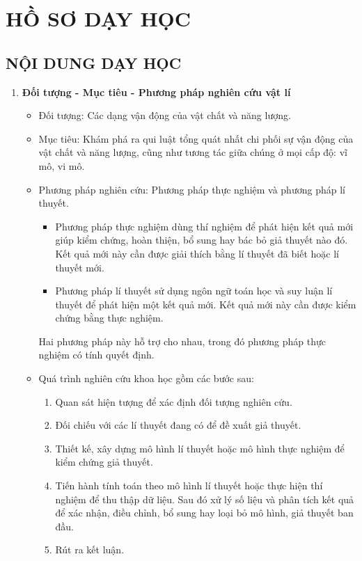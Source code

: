 \section{HỒ SƠ DẠY HỌC}
\subsection{NỘI DUNG DẠY HỌC}
\begin{enumerate}[label=\bfseries\arabic*.]
	\item \textbf{Đối tượng - Mục tiêu - Phương pháp nghiên cứu vật lí}
	\begin{itemize}
		\item Đối tượng: Các dạng vận động của vật chất và năng lượng.
		\item Mục tiêu: Khám phá ra qui luật tổng quát nhất chi phối sự vận động của vật chất và năng lượng, cũng như tương tác giữa chúng ở mọi cấp độ: vĩ mô, vi mô.
		\item Phương pháp nghiên cứu: Phương pháp thực nghiệm và phương pháp lí thuyết.
		\begin{itemize}
			\item Phương pháp thực nghiệm dùng thí nghiệm để phát hiện kết quả mới giúp kiểm chứng, hoàn thiện, bổ sung hay bác bỏ giả thuyết nào đó. Kết quả mới này cần được giải thích bằng lí thuyết đã biết hoặc lí thuyết mới.
			\item Phương pháp lí thuyết sử dụng ngôn ngữ toán học và suy luận lí thuyết để phát hiện một kết quả mới. Kết quả mới này cần được kiểm chứng bằng thực nghiệm.
		\end{itemize}
	Hai phương pháp này hỗ trợ cho nhau, trong đó phương
	pháp thực nghiệm có tính quyết định.
	\item Quá trình nghiên cứu khoa học gồm các bước sau:
	\begin{enumerate}[label=\bfseries Bước \arabic*.]
		\item Quan sát hiện tượng để xác định đối tượng nghiên cứu.
		\item Đối chiếu với các lí thuyết đang có để đề xuất giả thuyết.
		\item Thiết kế, xây dựng mô hình lí thuyết hoặc mô hình thực nghiệm để kiểm chứng giả thuyết.
		\item Tiến hành tính toán theo mô hình lí thuyết hoặc thực hiện thí nghiệm để thu thập dữ liệu. Sau đó xử lý số liệu và phân tích kết quả để xác nhận, điều chỉnh, bổ sung hay loại bỏ mô hình, giả thuyết ban đầu.
		\item Rút ra kết luận.
	\end{enumerate}

\end{itemize}
\end{enumerate}
